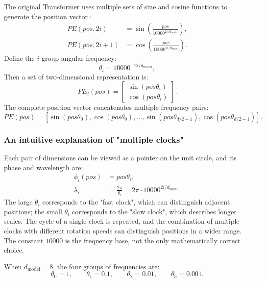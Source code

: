 \documentclass[UTF8,fontset=none,a4paper,10pt]{ctexart}
\begin{document}
The original Transformer uses multiple sets of sine and cosine functions to generate the position vector \cite{en:vaswani2017}:
\begin{align}
  PE(pos,2i)&=\sin\!\left(\frac{pos}{10000^{2i/d_{\text{model}}}}\right), \label{en:eq:sin-pe}\\
  PE(pos,2i+1)&=\cos\!\left(\frac{pos}{10000^{2i/d_{\text{model}}}}\right). \label{en:eq:cos-pe}
\end{align}
Define the $i$ group angular frequency:
\begin{equation}
  \theta_i=10000^{-2i/d_{\text{model}}},
  \label{en:eq:sin-theta}
\end{equation}
Then a set of two-dimensional representation is:
\begin{equation}
  PE_i(pos)=
  \begin{bmatrix}
    \sin(pos\theta_i)\\
    \cos(pos\theta_i)
  \end{bmatrix}.
  \label{en:eq:sin-pair}
\end{equation}
The complete position vector concatenates multiple frequency pairs:
\begin{equation}
  PE(pos)=[\sin(pos\theta_0),\cos(pos\theta_0),\ldots,
  \sin(pos\theta_{d/2-1}),\cos(pos\theta_{d/2-1})].
  \label{en:eq:sin-full}
\end{equation}

\subsubsection{An intuitive explanation of "multiple clocks"}

Each pair of dimensions can be viewed as a pointer on the unit circle, and its phase and wavelength are:
\begin{align}
  \phi_i(pos)&=pos\theta_i, \label{en:eq:phase}\\
  \lambda_i&=\frac{2\pi}{\theta_i}=2\pi\cdot10000^{2i/d_{\text{model}}}. \label{en:eq:wavelength}
\end{align}
The large $\theta_i$ corresponds to the "fast clock", which can distinguish adjacent positions; the small $\theta_i$ corresponds to the "slow clock", which describes longer scales. The cycle of a single clock is repeated, and the combination of multiple clocks with different rotation speeds can distinguish positions in a wider range. The constant $10000$ is the frequency base, not the only mathematically correct choice.

When $d_{\text{model}}=8$, the four groups of frequencies are:
\begin{equation}
  \theta_0=1,\qquad \theta_1=0.1,\qquad
  \theta_2=0.01,\qquad \theta_3=0.001.
  \label{en:eq:d8-frequency}
\end{equation}
\end{document}
